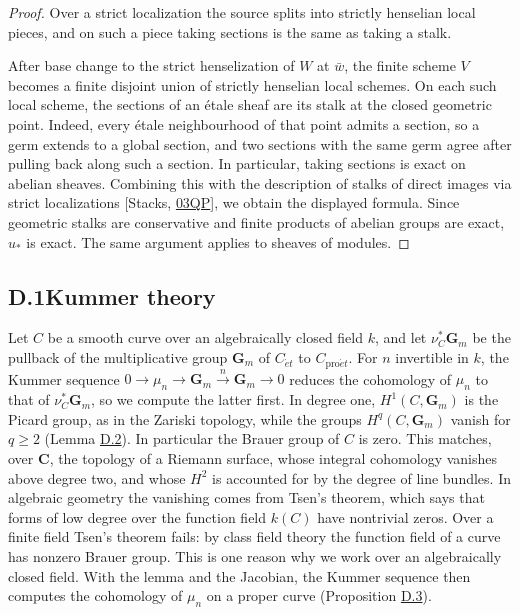 \documentclass[11pt]{article}
\begin{document}
\begin{proof}[{Proof}]\label{bp4}%
Over a strict localization the source splits into strictly henselian local pieces, and on such a piece taking sections is the same as taking a stalk.

After base change to the strict henselization of \(W\) at \(\bar w\), the finite scheme \(V\) becomes a finite disjoint union of strictly henselian local schemes. On each such local scheme, the sections of an étale sheaf are its stalk at the closed geometric point. Indeed, every étale neighbourhood of that point admits a section, so a germ extends to a global section, and two sections with the same germ agree after pulling back along such a section. In particular, taking sections is exact on abelian sheaves. Combining this with the description of stalks of direct images via strict localizations [Stacks, \href{https://stacks.math.columbia.edu/tag/03QP}{03QP}], we obtain the displayed formula. Since geometric stalks are conservative and finite products of abelian groups are exact, \(u_*\) is exact. The same argument applies to sheaves of modules.
\end{proof}

\subsection*{\texorpdfstring{D.1\quad Kummer theory}{D.1 Kummer theory}}
\label{bp5}%
\label{bp6}%
Let \(C\) be a smooth curve over an algebraically closed field \(k\), and let \(\nu_C^*\mathbf G_m\) be the pullback of the multiplicative group \(\mathbf G_m\) of \(C_{\acute{e}t}\) to \(C_{\mathrm{pro}\acute{e}t}\). For \(n\) invertible in \(k\), the Kummer sequence \(0\to\mu_n\to\mathbf G_m\xrightarrow{n}\mathbf G_m\to0\) reduces the cohomology of \(\mu_n\) to that of \(\nu_C^*\mathbf G_m\), so we compute the latter first. In degree one, \(H^1(C,\mathbf G_m)\) is the Picard group, as in the Zariski topology, while the groups \(H^q(C,\mathbf G_m)\) vanish for \(q\ge2\) (Lemma \hyperref[bp7]{D.2}). In particular the Brauer group of \(C\) is zero. This matches, over \(\mathbf C\), the topology of a Riemann surface, whose integral cohomology vanishes above degree two, and whose \(H^2\) is accounted for by the degree of line bundles. In algebraic geometry the vanishing comes from Tsen's theorem, which says that forms of low degree over the function field \(k(C)\) have nontrivial zeros. Over a finite field Tsen's theorem fails: by class field theory the function field of a curve has nonzero Brauer group. This is one reason why we work over an algebraically closed field. With the lemma and the Jacobian, the Kummer sequence then computes the cohomology of \(\mu_n\) on a proper curve (Proposition \hyperref[bp10]{D.3}).
\end{document}
